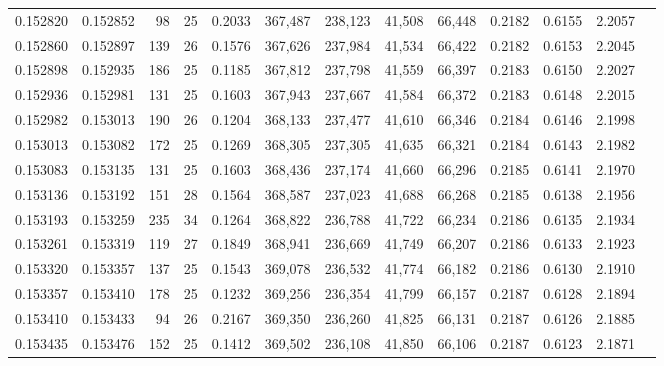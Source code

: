 \begin{tabular}{rrrrrrrrrrrrr}
0.152820 & 0.152852 &  98 &  25 &                                     0.2033 & 367,487 & 238,123 &  41,508 &  66,448 & 0.2182 & 0.6155 & 2.2057 \\
0.152860 & 0.152897 & 139 &  26 &                                     0.1576 & 367,626 & 237,984 &  41,534 &  66,422 & 0.2182 & 0.6153 & 2.2045 \\
0.152898 & 0.152935 & 186 &  25 &                                     0.1185 & 367,812 & 237,798 &  41,559 &  66,397 & 0.2183 & 0.6150 & 2.2027 \\
0.152936 & 0.152981 & 131 &  25 &                                     0.1603 & 367,943 & 237,667 &  41,584 &  66,372 & 0.2183 & 0.6148 & 2.2015 \\
0.152982 & 0.153013 & 190 &  26 &                                     0.1204 & 368,133 & 237,477 &  41,610 &  66,346 & 0.2184 & 0.6146 & 2.1998 \\
0.153013 & 0.153082 & 172 &  25 &                                     0.1269 & 368,305 & 237,305 &  41,635 &  66,321 & 0.2184 & 0.6143 & 2.1982 \\
0.153083 & 0.153135 & 131 &  25 &                                     0.1603 & 368,436 & 237,174 &  41,660 &  66,296 & 0.2185 & 0.6141 & 2.1970 \\
0.153136 & 0.153192 & 151 &  28 &                                     0.1564 & 368,587 & 237,023 &  41,688 &  66,268 & 0.2185 & 0.6138 & 2.1956 \\
0.153193 & 0.153259 & 235 &  34 &                                     0.1264 & 368,822 & 236,788 &  41,722 &  66,234 & 0.2186 & 0.6135 & 2.1934 \\
0.153261 & 0.153319 & 119 &  27 &                                     0.1849 & 368,941 & 236,669 &  41,749 &  66,207 & 0.2186 & 0.6133 & 2.1923 \\
0.153320 & 0.153357 & 137 &  25 &                                     0.1543 & 369,078 & 236,532 &  41,774 &  66,182 & 0.2186 & 0.6130 & 2.1910 \\
0.153357 & 0.153410 & 178 &  25 &                                     0.1232 & 369,256 & 236,354 &  41,799 &  66,157 & 0.2187 & 0.6128 & 2.1894 \\
0.153410 & 0.153433 &  94 &  26 &                                     0.2167 & 369,350 & 236,260 &  41,825 &  66,131 & 0.2187 & 0.6126 & 2.1885 \\
0.153435 & 0.153476 & 152 &  25 &                                     0.1412 & 369,502 & 236,108 &  41,850 &  66,106 & 0.2187 & 0.6123 & 2.1871 \\

\end{tabular}
